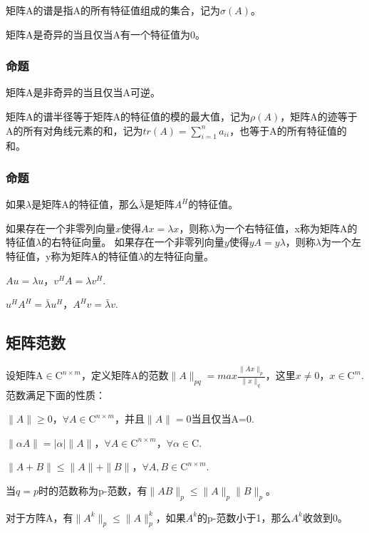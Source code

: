 \documentclass{article}
\begin{document}
矩阵A的谱是指A的所有特征值组成的集合，记为$\sigma (A)$。

矩阵A是奇异的当且仅当A有一个特征值为0。

\subsubsection{命题}
矩阵A是非奇异的当且仅当A可逆。

矩阵A的谱半径等于矩阵A的特征值的模的最大值，记为$\rho (A)$，矩阵A的迹等于A的所有对角线元素的和，记为$tr(A)=\sum_{i=1}^n a_{ii}$，也等于A的所有特征值的和。

\subsubsection{命题}
如果$\lambda$是矩阵A的特征值，那么$\bar\lambda$是矩阵$A^H$的特征值。

如果存在一个非零列向量$x$使得$Ax=\lambda x$，则称$\lambda $为一个右特征值，x称为矩阵A的特征值$\lambda $的右特征向量。
如果存在一个非零列向量$y$使得$yA=y\lambda$，则称$\lambda $为一个左特征值，y称为矩阵A的特征值$\lambda $的左特征向量。

$Au=\lambda u$，$v^HA=\lambda v^H$.

$u^HA^H=\bar{\lambda}u^H$，$A^Hv=\bar{\lambda}v$.



\subsection{矩阵范数}
设矩阵A$\in\mathrm{C}^{n\times m}$，定义矩阵A的范数$\parallel A\parallel _{pq}=max\frac{\parallel Ax\parallel _p}{\parallel x\parallel _q}$，这里$x\neq 0$，$x\in\mathrm{C}^{m}$.
范数满足下面的性质：

$\parallel A\parallel\ge 0$，$\forall A\in\mathrm{C}^{n\times m}$，并且$\parallel A\parallel = 0$当且仅当A=0.

$\parallel\alpha A\parallel = |\alpha|\parallel A\parallel$，$\forall A\in\mathrm{C}^{n\times m}$，$\forall\alpha\in\mathrm{C}$.

$\parallel A+B\parallel\leqslant\parallel A\parallel+\parallel B\parallel$，$\forall A,B\in\mathrm{C}^{n\times m}$.

当$q=p$时的范数称为p-范数，有$\parallel AB\parallel _p\leqslant\parallel A\parallel _p\parallel B\parallel_p$。

对于方阵A，有$\parallel A^k\parallel_p\leqslant\parallel A\parallel ^k _p$，如果$A^k$的p-范数小于1，那么$A^k$收敛到0。
\end{document}
